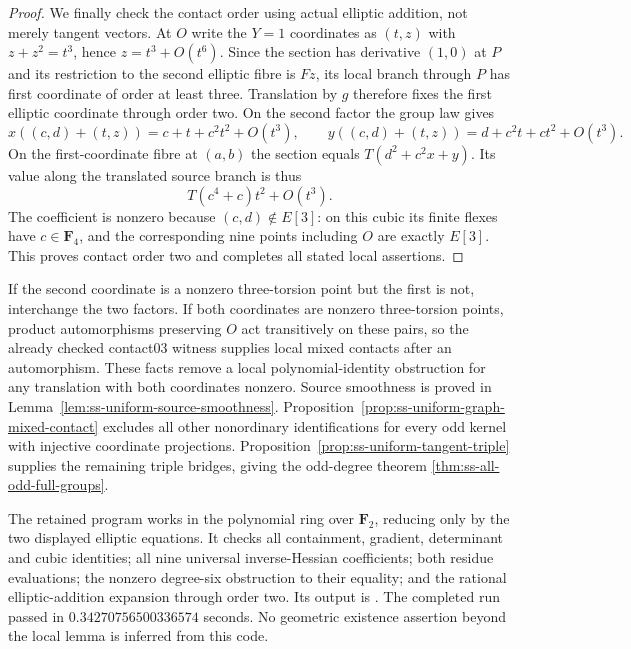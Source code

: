 \begin{proof}
We finally check the contact order using actual elliptic addition,
not merely tangent vectors. At $O$ write the $Y=1$ coordinates as
$(t,z)$ with $z+z^2=t^3$, hence $z=t^3+O(t^6)$. Since the section
has derivative $(1,0)$ at $P$ and its restriction to the second
elliptic fibre is $Fz$, its local branch through $P$ has first
coordinate of order at least three. Translation by $g$ therefore
fixes the first elliptic coordinate through order two. On the second
factor the group law gives
\[
 x((c,d)+(t,z))=c+t+c^2t^2+O(t^3),\qquad
 y((c,d)+(t,z))=d+c^2t+ct^2+O(t^3).
\]
On the first-coordinate fibre at $(a,b)$ the section equals
$T(d^2+c^2x+y)$. Its value along the translated source branch is
thus
\[
                         T(c^4+c)t^2+O(t^3).
\]
The coefficient is nonzero because $(c,d)\notin E[3]$: on this cubic
its finite flexes have $c\in\mathbf F_4$, and the corresponding
nine points including $O$ are exactly $E[3]$. This proves contact
order two and completes all stated local assertions.
\end{proof}

\begin{remark}\label{auto:A_monodromy:b303eb6cd268}

If the second coordinate is a nonzero three-torsion point but the
first is not, interchange the two factors. If both coordinates are
nonzero three-torsion points, product automorphisms preserving $O$
act transitively on these pairs, so the already checked contact03
witness supplies local mixed contacts after an automorphism.
These facts remove a local polynomial-identity obstruction for any
translation with both coordinates nonzero. Source smoothness is proved in
Lemma~\ref{lem:ss-uniform-source-smoothness}. Proposition~\ref{prop:ss-uniform-graph-mixed-contact} excludes all other
nonordinary identifications for every odd kernel with injective
coordinate projections. Proposition~\ref{prop:ss-uniform-tangent-triple}
supplies the remaining triple bridges, giving the odd-degree theorem
\ref{thm:ss-all-odd-full-groups}.
\end{remark}

\begin{remark}\label{auto:A_monodromy:ee94dcb570ad}

The retained program
works in the polynomial ring over $\mathbf F_2$, reducing only by the
two displayed elliptic equations. It checks all containment, gradient,
determinant and cubic identities; all nine universal inverse-Hessian
coefficients; both residue evaluations; the nonzero degree-six
obstruction to their equality; and the rational elliptic-addition
expansion through order two. Its output is
.
The completed run passed in $0.34270756500336574$ seconds. No geometric
existence assertion beyond the local lemma is inferred from this code.
\end{remark}



